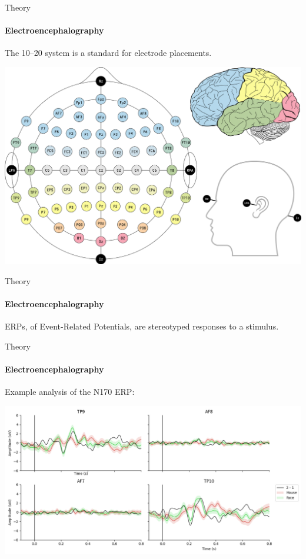 \documentclass[xcolor={dvipsnames,table},12pt]{beamer}
\newif\ifplacelogo{}  %
\begin{document}
\begin{frame}{Theory}
    \framesubtitle{Electroencephalography}
    The 10--20 system is a standard for electrode placements.

    \begin{adjustbox}{width=0.8\textwidth,center}
        \includegraphics{img/1020system-extended-with-extra-info.png}
    \end{adjustbox}
\end{frame}

\begin{frame}{Theory}
    \framesubtitle{Electroencephalography}
    ERPs, of Event-Related Potentials, are stereotyped responses to a stimulus.

    \begin{adjustbox}{width=\textwidth,center,float=table}
        
    \end{adjustbox}
\end{frame}

\placelogofalse{}
\begin{frame}{Theory}
    \framesubtitle{Electroencephalography}
    Example analysis of the N170 ERP:
    
    \begin{adjustbox}{width=\textwidth,center,float=figure}
        \includegraphics[width=\textwidth]{img/n170_viz.png}
    \end{adjustbox}
\end{frame}
\placelogotrue{}
\end{document}
